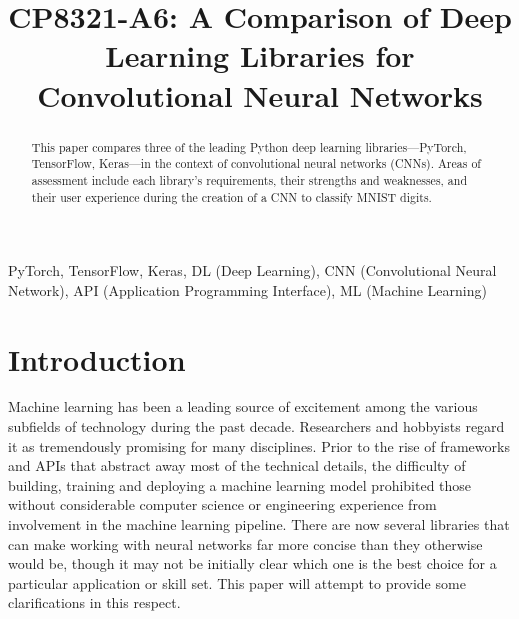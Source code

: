 \documentclass[conference]{IEEEtran}
\begin{document}
\title{CP8321-A6: A Comparison of Deep Learning Libraries for Convolutional Neural Networks\\
}

\author{
}

\maketitle


\begin{abstract}
This paper compares three of the leading Python deep learning libraries---PyTorch, TensorFlow, Keras---in the context of convolutional neural networks (CNNs). Areas of assessment include each library's requirements, their strengths and weaknesses, and their user experience during the creation of a CNN to classify MNIST digits. 
\end{abstract}

\begin{IEEEkeywords}
PyTorch, TensorFlow, Keras, DL (Deep Learning), CNN (Convolutional Neural Network), API (Application Programming Interface), ML (Machine Learning)
\end{IEEEkeywords}

\section{Introduction}
Machine learning has been a leading source of excitement among the various subfields of technology during the past decade. Researchers and hobbyists regard it as tremendously promising for many disciplines. Prior to the rise of frameworks and APIs that abstract away most of the technical details, the difficulty of building, training and deploying a machine learning model prohibited those without considerable computer science or engineering experience from involvement in the machine learning pipeline. There are now several libraries that can make working with neural networks far more concise than they otherwise would be, though it may not be initially clear which one is the best choice for a particular application or skill set. This paper will attempt to provide some clarifications in this respect.
\end{document}
